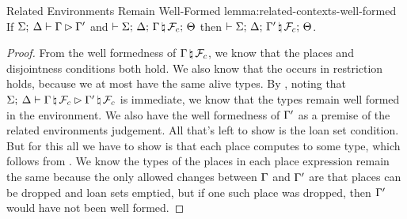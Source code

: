\begin{oxlemma}{Related Environments Remain Well-Formed}
  {lemma:related-contexts-well-formed} If
  $\Sigma; \: \Delta \vdash \Gamma \rhd \Gamma^\prime$ and
  $\vdash \Sigma; \, \Delta; \, \Gamma \, \natural \, \mathcal{F}_{c}; \, \Theta$ then
  $\vdash \Sigma; \, \Delta; \, \Gamma^\prime \, \natural \, \mathcal{F}_{c}; \, \Theta$.
\end{oxlemma}

\begin{proof}
  From the well formedness of $\Gamma \, \natural \, \mathcal{F}_c$, we know that
  the places and disjointness conditions both hold. We also know that the occurs
  in restriction holds, because we at most have the same alive types. By
  , noting that
  $\Sigma; \: \Delta \vdash \Gamma \, \natural \, \mathcal{F}_c \rhd \Gamma^\prime \, \natural \, \mathcal{F}_c$
  is immediate, we know that the types remain well formed in the environment. We
  also have the well formedness of $\Gamma^\prime$ as a premise of the
  related environments judgement. All that's left to show is the loan set
  condition. But for this all we have to show is that each place computes to
  some type, which follows from . We know the
  types of the places in each place expression remain the same because the only
  allowed changes between $\Gamma$ and $\Gamma^\prime$ are that places can
  be dropped and loan sets emptied, but if one such place was dropped, then
  $\Gamma^\prime$ would have not been well formed.
\end{proof}

